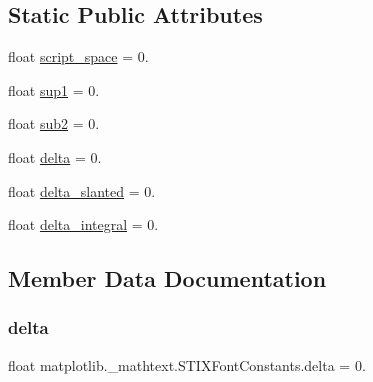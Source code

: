 \subsection*{Static Public Attributes}
\begin{DoxyCompactItemize}
\item 
float \hyperlink{classmatplotlib_1_1__mathtext_1_1STIXFontConstants_a7bbb068a3b8cb47f5e864f9d3533ee3c}{script\+\_\+space} = 0.
\item 
float \hyperlink{classmatplotlib_1_1__mathtext_1_1STIXFontConstants_ab5fdfe8740306f5764391aa173dcac7a}{sup1} = 0.
\item 
float \hyperlink{classmatplotlib_1_1__mathtext_1_1STIXFontConstants_a429df2b42c9babe2120ffd2e96875608}{sub2} = 0.
\item 
float \hyperlink{classmatplotlib_1_1__mathtext_1_1STIXFontConstants_ad9bc0ddd94395acc24e9427885fbd202}{delta} = 0.
\item 
float \hyperlink{classmatplotlib_1_1__mathtext_1_1STIXFontConstants_a66d7d37085cbc6450a68dee60a6fc5d9}{delta\+\_\+slanted} = 0.
\item 
float \hyperlink{classmatplotlib_1_1__mathtext_1_1STIXFontConstants_a2a8d73ed97fe6ceaafca838c454b43bc}{delta\+\_\+integral} = 0.
\end{DoxyCompactItemize}


\subsection{Member Data Documentation}
\mbox{\label{classmatplotlib_1_1__mathtext_1_1STIXFontConstants_ad9bc0ddd94395acc24e9427885fbd202}} 
\subsubsection{\texorpdfstring{delta}{delta}}
{\footnotesize\ttfamily float matplotlib.\+\_\+mathtext.\+S\+T\+I\+X\+Font\+Constants.\+delta = 0.\hspace{0.3cm}{\ttfamily [static]}}

\mbox{\label{classmatplotlib_1_1__mathtext_1_1STIXFontConstants_a2a8d73ed97fe6ceaafca838c454b43bc}} 
